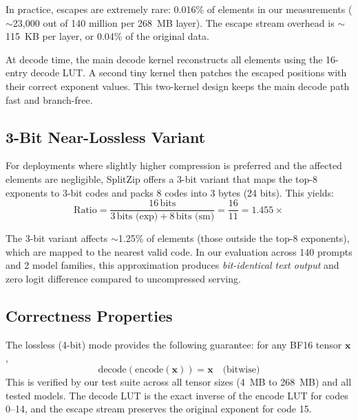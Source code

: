 In practice, escapes are extremely rare: 0.016\% of elements in our measurements ($\sim$23,000 out of 140 million per 268~MB layer). The escape stream overhead is $\sim$115~KB per layer, or 0.04\% of the original data.

At decode time, the main decode kernel reconstructs all elements using the 16-entry decode LUT. A second tiny kernel then patches the escaped positions with their correct exponent values. This two-kernel design keeps the main decode path fast and branch-free.

\subsection{3-Bit Near-Lossless Variant}

For deployments where slightly higher compression is preferred and the affected elements are negligible, SplitZip offers a 3-bit variant that maps the top-8 exponents to 3-bit codes and packs 8 codes into 3 bytes (24 bits). This yields:
\[
\text{Ratio} = \frac{16\,\text{bits}}{3\,\text{bits (exp)} + 8\,\text{bits (sm)}} = \frac{16}{11} = 1.455\times
\]

The 3-bit variant affects $\sim$1.25\% of elements (those outside the top-8 exponents), which are mapped to the nearest valid code. In our evaluation across 140 prompts and 2 model families, this approximation produces \emph{bit-identical text output} and zero logit difference compared to uncompressed serving.

\subsection{Correctness Properties}

The lossless (4-bit) mode provides the following guarantee: for any BF16 tensor $\mathbf{x}$,
\[
\text{decode}(\text{encode}(\mathbf{x})) = \mathbf{x} \quad \text{(bitwise)}
\]
This is verified by our test suite across all tensor sizes (4~MB to 268~MB) and all tested models. The decode LUT is the exact inverse of the encode LUT for codes 0--14, and the escape stream preserves the original exponent for code 15.
